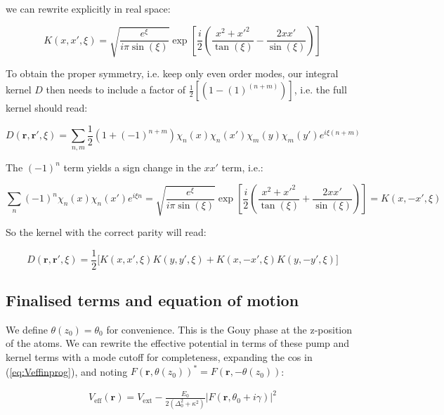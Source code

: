 \documentclass[a4paper,nobalancelastpage]{revtex4-1}
\newcommand{\vect}[1]{\bm{#1}}
\newcommand{\abs}[1]{\lvert #1 \rvert}
\begin{document}
we can rewrite explicitly in real space:

\begin{equation}
\label{eq:integralkernelK}
K(x,x',\xi)=\sqrt{\frac{e^{\xi}}{i \pi \sin(\xi)}} \exp{\left[ 
\frac{i }{2 } \left(
\frac{x^2+x'^2}{\tan(\xi)}-\frac{2 x x'}{\sin(\xi)}
\right) \right] }
\end{equation}

To obtain the proper symmetry, i.e. keep only even order modes, our integral kernel $D$ then needs to include a factor of $\frac{1}{2}[(1-(1)^(n+m))]$, i.e. the full kernel should read:

\begin{equation}
D(\textbf{r},\textbf{r}',\xi)= \sum_{n,m} \frac{1}{2} (1+(-1)^{n+m}) \chi_n (x) \chi_n (x') \chi_m (y) \chi_m (y') e^{i\xi(n+m)}
\end{equation}

The $(-1)^n$ term yields a sign change in the $xx'$ term, i.e.:

\begin{equation}
\sum_{n} (-1)^n \chi_n (x) \chi_n (x') e^{i\xi n}= \sqrt{\frac{e^{\xi}}{i \pi \sin(\xi)}} \exp{\left[ \frac{i }{2 } \left(
\frac{x^2+x'^2}{\tan(\xi)}+\frac{2 x x'}{\sin(\xi)}  
\right) \right] } =
K(x,-x',\xi)
\end{equation}

So the kernel with the correct parity will read:

\begin{equation}
\label{eq:integralkernelD}
D(\textbf{r},\textbf{r}',\xi)=\frac{1}{2} \big[ K(x,x',\xi)K(y,y',\xi)+ K(x,-x',\xi)K(y,-y',\xi) \big]
\end{equation}

\subsection{Finalised terms and equation of motion}

We define $\theta(z_0)=\theta_0$ for convenience. This is the Gouy phase at the z-position of the atoms.
We can rewrite the effective potential in terms of these pump and kernel terms with a mode cutoff for completeness, expanding the cos in (\ref{eq:Veffinprog}), and noting $F(\vect{r},\theta(z_0))^*=F(\vect{r},-\theta(z_0))$:

\begin{align}
\label{eq:Veff}
V_{\text{eff}} (\vect{r}) = V_{\text{ext}} - \frac{E_0}{2(\Delta_0^2+\kappa^2)} \abs{F(\vect{r},\theta_0+i \gamma)}^2
\end{align}
\end{document}
